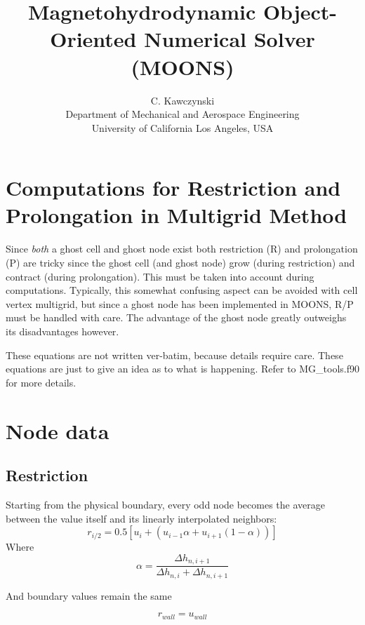 \documentclass[11pt]{article}
\begin{document}
\doublespacing
\title{Magnetohydrodynamic Object-Oriented Numerical Solver (MOONS)}
\author{C. Kawczynski \\
Department of Mechanical and Aerospace Engineering \\
University of California Los Angeles, USA\\
}
\maketitle

\section{Computations for Restriction and Prolongation in Multigrid Method}
Since \textit{both} a ghost cell and ghost node exist both restriction (R) and prolongation (P) are tricky since the ghost cell (and ghost node) grow (during restriction) and contract (during prolongation). This must be taken into account during computations. Typically, this somewhat confusing aspect can be avoided with cell vertex multigrid, but since a ghost node has been implemented in MOONS, R/P must be handled with care. The advantage of the ghost node greatly outweighs its disadvantages however.

These equations are not written ver-batim, because details require care. These equations are just to give an idea as to what is happening. Refer to MG\_tools.f90 for more details.

\section{Node data}

\subsection{Restriction}
Starting from the physical boundary, every odd node becomes the average between the value itself and its linearly interpolated neighbors:
\begin{equation}
	r_{i/2} = 0.5 \left[ u_i + (u_{i-1}\alpha + u_{i+1}(1-\alpha)) \right]
\end{equation}
Where
\begin{equation}
	\alpha = \frac{\Delta h_{n,i+1}}{\Delta h_{n,i} + \Delta h_{n,i+1}}
\end{equation}

And boundary values remain the same

\begin{equation}
	r_{wall} = u_{wall}
\end{equation}
\end{document}
